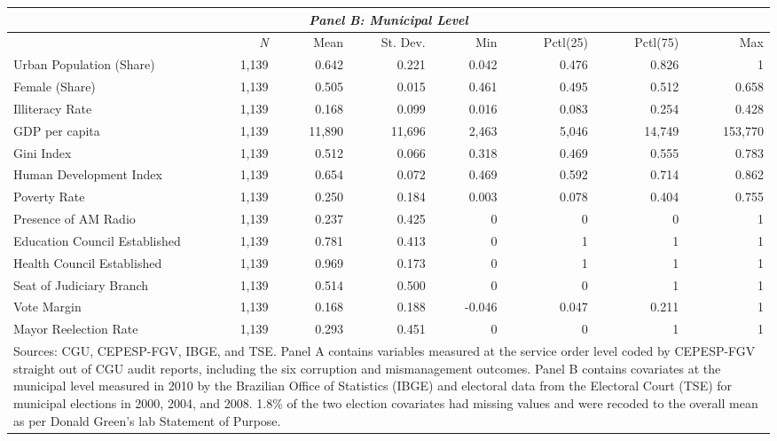 \documentclass[11pt]{article}
\newcommand\T{\rule{0pt}{2.6ex}}       %
\newcommand\B{\rule[-1.2ex]{0pt}{0pt}} %
\begin{document}
\begin{table}[!htbp]
\begin{tabular}{lrrrrrrr}
  \multicolumn{8}{c}{\emph{Panel B: Municipal Level}} \T \B \\
  \hline
  & \multicolumn{1}{r}{\emph{N}} & \multicolumn{1}{r}{Mean} & \multicolumn{1}{r}{St. Dev.} & \multicolumn{1}{r}{Min} & \multicolumn{1}{r}{Pctl(25)} & \multicolumn{1}{r}{Pctl(75)} & \multicolumn{1}{r}{Max} \T \B \\
  \hline
  Urban Population (Share)      & 1,139 & 0.642 & 0.221 & 0.042 & 0.476 & 0.826 & 1       \T \B \\
  Female (Share)                & 1,139 & 0.505 & 0.015 & 0.461 & 0.495 & 0.512 & 0.658   \T \B \\
  Illiteracy Rate               & 1,139 & 0.168 & 0.099 & 0.016 & 0.083 & 0.254 & 0.428   \T \B \\
  GDP per capita                & 1,139 & 11,890& 11,696& 2,463 & 5,046 & 14,749& 153,770 \T \B \\
  Gini Index                    & 1,139 & 0.512 & 0.066 & 0.318 & 0.469 & 0.555 & 0.783   \T \B \\
  Human Development Index       & 1,139 & 0.654 & 0.072 & 0.469 & 0.592 & 0.714 & 0.862   \T \B \\
  Poverty Rate                  & 1,139 & 0.250 & 0.184 & 0.003 & 0.078 & 0.404 & 0.755   \T \B \\
  Presence of AM Radio          & 1,139 & 0.237 & 0.425 & 0     & 0     & 0     & 1       \T \B \\
  Education Council Established & 1,139 & 0.781 & 0.413 & 0     & 1     & 1     & 1       \T \B \\
  Health Council Established    & 1,139 & 0.969 & 0.173 & 0     & 1     & 1     & 1       \T \B \\
  Seat of Judiciary Branch      & 1,139 & 0.514 & 0.500 & 0     & 0     & 1     & 1       \T \B \\
  Vote Margin                   & 1,139 & 0.168 & 0.188 & -0.046& 0.047 & 0.211 & 1       \T \B \\
  Mayor Reelection Rate         & 1,139 & 0.293 & 0.451 & 0     & 0     & 1     & 1       \T \B \\
  \hline

  \hline
  \multicolumn{8}{p{\textwidth}}{\footnotesize Sources: CGU, CEPESP-FGV, IBGE, and TSE. Panel A contains variables measured at the service order level coded by CEPESP-FGV straight out of CGU audit reports, including the six corruption and mismanagement outcomes. Panel B contains covariates at the municipal level measured in 2010 by the Brazilian Office of Statistics (IBGE) and electoral data from the Electoral Court (TSE) for municipal elections in 2000, 2004, and 2008. 1.8\% of the two election covariates had missing values and were recoded to the overall mean as per Donald Green's lab Statement of Purpose.} \T
  \end{tabular}
\end{table}
\end{document}
